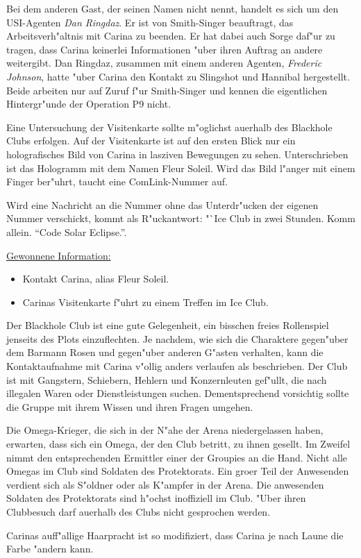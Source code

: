Bei dem anderen Gast, der seinen Namen nicht nennt, handelt es sich um den USI-Agenten \emph{Dan Ringdaz}. Er ist von Smith-Singer beauftragt, das Arbeitsverh"altnis mit Carina zu beenden. Er hat dabei auch Sorge daf"ur zu tragen, dass Carina keinerlei Informationen "uber ihren Auftrag an andere weitergibt. Dan Ringdaz, zusammen mit einem anderen Agenten, \emph{Frederic Johnson}, hatte "uber Carina den Kontakt zu Slingshot und Hannibal hergestellt. Beide arbeiten nur auf Zuruf f"ur Smith-Singer und kennen die eigentlichen Hintergr"unde der Operation P9 nicht.


Eine Untersuchung der Visitenkarte sollte m"oglichst au\3erhalb des Blackhole Clubs erfolgen. Auf der Visitenkarte ist auf den ersten Blick nur ein holografisches Bild von Carina in lasziven Bewegungen zu sehen. Unterschrieben ist das Hologramm mit dem Namen Fleur Soleil. Wird das Bild l"anger mit einem Finger ber"uhrt, taucht eine ComLink-Nummer auf.

Wird eine Nachricht an die Nummer ohne das Unterdr"ucken der eigenen Nummer verschickt, kommt als R"uckantwort: "`Ice Club in zwei Stunden. Komm allein. "`Code Solar Eclipse."'.

\begin{remarks}
	\underline{Gewonnene Information:}

	\begin{itemize}
		\item Kontakt Carina, alias Fleur Soleil.
		\item Carinas Visitenkarte f"uhrt zu einem Treffen im Ice Club.
	\end{itemize}

	Der Blackhole Club ist eine gute Gelegenheit, ein bisschen freies Rollenspiel jenseits des Plots einzuflechten. Je nachdem, wie sich die Charaktere gegen"uber dem Barmann Rosen und gegen"uber anderen G"asten verhalten, kann die Kontaktaufnahme mit Carina v"ollig anders verlaufen als beschrieben. Der Club ist mit Gangstern, Schiebern, Hehlern und Konzernleuten gef"ullt, die nach illegalen Waren oder Dienstleistungen suchen. Dementsprechend vorsichtig sollte die Gruppe mit ihrem Wissen und ihren Fragen umgehen.

	Die Omega-Krieger, die sich in der N"ahe der Arena niedergelassen haben, erwarten, dass sich ein Omega, der den Club betritt, zu ihnen gesellt. Im Zweifel nimmt den entsprechenden Ermittler einer der Groupies an die Hand. Nicht alle Omegas im Club sind Soldaten des Protektorats. Ein gro\3er Teil der Anwesenden verdient sich als S"oldner oder als K"ampfer in der Arena. Die anwesenden Soldaten des Protektorats sind h"ochst inoffiziell im Club. "Uber ihren Clubbesuch darf au\3erhalb des Clubs nicht gesprochen werden.
	
	Carinas auff"allige Haarpracht ist so modifiziert, dass Carina je nach Laune die Farbe "andern kann.
\end{remarks}


